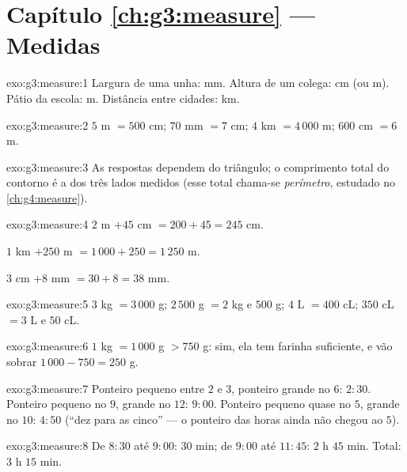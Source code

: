 \section*{Capítulo \ref{ch:g3:measure} --- Medidas}

\begin{solution}{exo:g3:measure:1}
Largura de uma unha: mm. Altura de um colega: cm (ou m). Pátio da
escola: m. Distância entre cidades: km.
\end{solution}

\begin{solution}{exo:g3:measure:2}
$5$ m $= 500$ cm; \quad $70$ mm $= 7$ cm; \quad
$4$ km $= 4\,000$ m; \quad $600$ cm $= 6$ m.
\end{solution}

\begin{solution}{exo:g3:measure:3}
As respostas dependem do triângulo; o comprimento total do contorno
é a  dos três lados medidos (esse total chama-se
\emph{perímetro}, estudado no \cref{ch:g4:measure}).
\end{solution}

\begin{solution}{exo:g3:measure:4}
$2$ m $+ 45$ cm $= 200 + 45 = 245$ cm.

$1$ km $+ 250$ m $= 1\,000 + 250 = 1\,250$ m.

$3$ cm $+ 8$ mm $= 30 + 8 = 38$ mm.
\end{solution}

\begin{solution}{exo:g3:measure:5}
$3$ kg $= 3\,000$ g; \quad $2\,500$ g $= 2$ kg e $500$ g; \quad
$4$ L $= 400$ cL; \quad $350$ cL $= 3$ L e $50$ cL.
\end{solution}

\begin{solution}{exo:g3:measure:6}
$1$ kg $= 1\,000$ g $> 750$ g: sim, ela tem farinha suficiente, e vão
sobrar $1\,000 - 750 = 250$ g.
\end{solution}

\begin{solution}{exo:g3:measure:7}
Ponteiro pequeno entre $2$ e $3$, ponteiro grande no $6$: $2{:}30$.
Ponteiro pequeno no $9$, grande no $12$: $9{:}00$. Ponteiro pequeno
quase no $5$, grande no $10$: $4{:}50$ (``dez para as cinco'' --- o
ponteiro das horas ainda não chegou ao $5$).
\end{solution}

\begin{solution}{exo:g3:measure:8}
De $8{:}30$ até $9{:}00$: $30$ min; de $9{:}00$ até $11{:}45$:
$2$ h $45$ min. Total: $3$ h $15$ min.
\end{solution}

